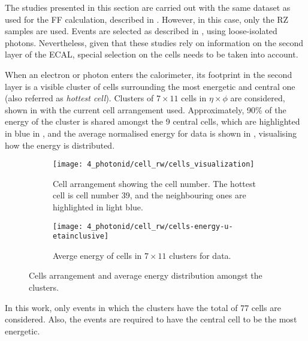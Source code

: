 The studies presented in this section are carried out with the same dataset as used for the \ac{FF} calculation, described in \Sect{\ref{subsec:ss_corrections:ffs:samples}}. However, in this case, only the \ac{RZ} samples are used.
Events are selected as described in \Sect{\ref{subsec:pid_ss:pid:event_selection}}, using loose-isolated photons. Nevertheless, given that these studies rely on information on the second layer of the \ac{ECAL}, special selection on the cells needs to be taken into account.

When an electron or photon enters the calorimeter, its footprint in the second layer is a visible cluster of cells surrounding the most energetic and central one (also referred as \textit{hottest cell}). Clusters of \(7\times 11\) cells in \(\eta\times\phi\) are considered, shown in \Fig{\ref{fig:ss_corrections:cell_rw:event_selection:cluster:arrangement}} with the current cell arrangement used.
Approximately, 90\% of the energy of the cluster is shared amongst the 9 central cells, which are highlighted in blue in \Fig{\ref{fig:ss_corrections:cell_rw:event_selection:cluster:arrangement}}, and the average normalised energy for data is shown in \Fig{\ref{fig:ss_corrections:cell_rw:event_selection:cluster:energy}}, visualising how the energy is distributed.

\begin{figure}[ht!]
    \centering
    \begin{subfigure}[t]{0.49\linewidth}
        \centering
        \texttt{[image: 4\_photonid/cell\_rw/cells\_visualization]}
        \caption{Cell arrangement showing the cell number. The hottest cell is cell number 39, and the neighbouring ones are highlighted in light blue.}
        \label{fig:ss_corrections:cell_rw:event_selection:cluster:arrangement}
    \end{subfigure}
    \hfill
    \begin{subfigure}[t]{0.49\linewidth}
        \centering
        \texttt{[image: 4\_photonid/cell\_rw/cells-energy-u-etainclusive]}
        \caption{Averge energy of cells in \(7\times 11\) clusters for data.}
        \label{fig:ss_corrections:cell_rw:event_selection:cluster:energy}
    \end{subfigure}
    \caption{Cells arrangement and average energy distribution amongst the clusters.}
    \label{fig:ss_corrections:cell_rw:event_selection:cluster}
\end{figure}

In this work, only events in which the clusters have the total of 77 cells are considered. Also, the events are required to have the central cell to be the most energetic.







